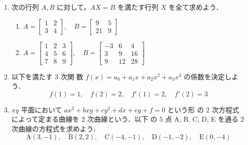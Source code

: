 \documentclass[11pt, uplatex, dvipdfmx]{jsarticle}
\begin{document}
\begin{enumerate}

  \setlength{\itemsep}{1zh}


\item 次の行列 $A, B$ に対して，$AX=B$ を満たす行列 $X$ を全て求めよう．

  \vspace{1ex}
  
  \begin{enumerate}[(1)]
    \setlength{\itemsep}{1zh}
    
  \item $A= \left[
      \begin{array}{rr}
        1 & 2\\
        3 & 4
      \end{array}
    \right] , \quad B=\left[
      \begin{array}{rr}
        9 & 5\\
        21 & 9
      \end{array}
    \right]$

  \item $A=\left[
      \begin{array}{ccc}
        1 & 2 & 3\\
        4 & 5 & 6\\
        7 & 8 & 9
      \end{array}
    \right], \quad B=\left[
      \begin{array}{rrr}
        -3 & 6 & 4\\
        3 & 9 & 16\\
        9 & 12 & 28
      \end{array}
    \right]$
  \end{enumerate}

\item 以下を満たす $3$ 次関
  数 $f(x)=a_0 + a_1 x + a_2 x^2 + a_3 x^3$ の係数を決定しよう．
  \[
    f(1)=1, \quad f(2)=2, \quad f'(1)=2, \quad f'(2)=3
  \]
  
\item $xy$ 平面において $a x^2 + bxy + cy^2 + dx + ey + f=0$ という形
  の $2$ 次方程式によって定まる曲線を $2$ 次曲線という．以下
  の $5$ 点 A, B, C, D, E を通る $2$ 次曲線の方程式を求めよう．
  \[
    \textrm{A}(3,-1), \quad \textrm{B}(2,2), \quad \textrm{C}(-4,-1),
    \quad \textrm{D}(-1,-2), \quad \textrm{E}(0,-4)
  \]


\end{enumerate}
\end{document}
